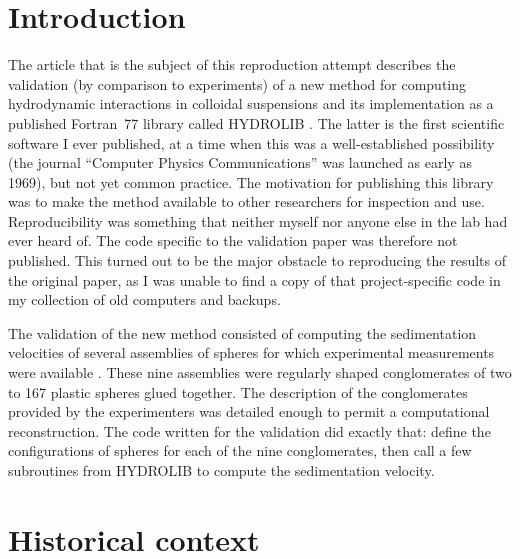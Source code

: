 \section*{Introduction}

The article that is the subject of this reproduction attempt \cite{CichockiFrictionmobilitymany1994} describes the validation (by comparison to experiments) of a new method for computing hydrodynamic interactions in colloidal suspensions \cite{CichockiFrictionmobilitymany1994} and its implementation as a published Fortran~77 library called HYDROLIB \cite{HinsenHYDROLIBlibraryevaluation1995}. The latter is the first scientific software I ever published, at a time when this was a well-established possibility (the journal ``Computer Physics Communications'' was launched as early as 1969), but not yet common practice. The motivation for publishing this library was to make the method available to other researchers for inspection and use. Reproducibility was something that neither myself nor anyone else in the lab had ever heard of. The code specific to the validation paper was therefore not published. This turned out to be the major obstacle to reproducing the results of the original paper, as I was unable to find a copy of that project-specific code in my collection of old computers and backups.

The validation of the new method consisted of computing the sedimentation velocities of several assemblies of spheres for which experimental measurements were available \cite{LassoStokesdraghollow1986}. These nine assemblies were regularly shaped conglomerates of two to 167 plastic spheres glued together. The description of the conglomerates provided by the experimenters was detailed enough to permit a computational reconstruction. The code written for the validation did exactly that: define the configurations of spheres for each of the nine conglomerates, then call a few subroutines from HYDROLIB to compute the sedimentation velocity.

\section*{Historical context}


